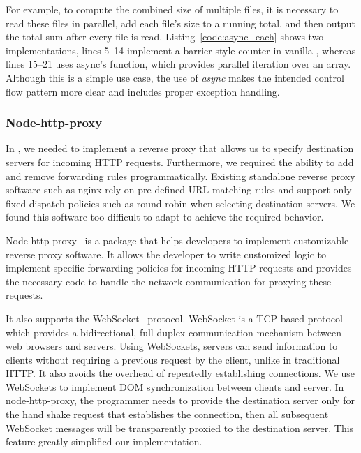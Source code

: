 For example, to compute the combined size of multiple files,
it is necessary to read these files in parallel, add each file's size 
to a running total, and then output the total sum after every file is read. 
Listing~\ref{code:async_each} shows two implementations,
lines 5--14 implement a barrier-style counter in vanilla \js, whereas 
lines 15--21 uses async's  function, which provides parallel 
iteration over an array. 
Although this is a simple use case, the use of \emph{async} makes the
intended control flow pattern more clear and includes proper exception
handling.



\subsubsection{Node-http-proxy}

In \cbtwo, we needed to implement a reverse proxy that allows us to specify
destination servers for incoming HTTP requests.
Furthermore, we required the ability to add and remove forwarding rules programmatically.
Existing standalone reverse proxy software such as nginx 
rely on pre-defined URL matching rules and support only fixed dispatch policies 
such as round-robin when selecting destination servers.
We found this software too difficult to adapt to achieve the required behavior.

Node-http-proxy~\cite{nodeproxy} is a \nodejs package that helps developers to 
implement customizable reverse proxy software.
It allows the developer to write customized logic to implement specific
forwarding policies for incoming HTTP requests and provides the necessary
code to handle the network communication for proxying these requests.

It also supports the WebSocket~\cite{rfc6455} protocol.
WebSocket is a TCP-based protocol which provides a bidirectional, full-duplex 
communication mechanism between web browsers and servers.
Using WebSockets, servers can send information to clients without requiring
a previous request by the client, unlike in traditional HTTP.
It also avoids the overhead of repeatedly establishing connections.
We use WebSockets to implement DOM synchronization between clients and server.
In node-http-proxy,
the programmer needs to provide the destination server only for the hand shake
request that establishes the connection, then all subsequent WebSocket messages will
be transparently proxied to the destination server.  
This feature greatly simplified our implementation.

